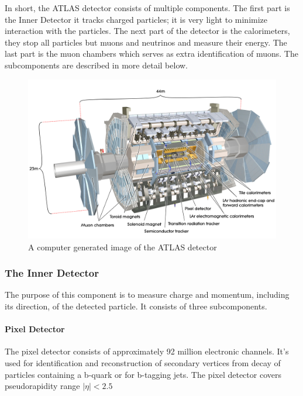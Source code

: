 \documentclass[12pt,a4paper]{article}
\numberwithin{equation}{section}
\begin{document}


In short, the ATLAS detector consists of multiple components. The first part is
the Inner Detector it tracks charged particles; it is very light to minimize
interaction with the particles. The next part of the detector is the
calorimeters, they stop all particles but muons and neutrinos and measure their
energy. The last part is the muon chambers which serves as extra identification
of muons. The subcomponents are described in more detail below.

\begin{figure}[H]
	\centering
	\includegraphics[scale=0.1]{figures/atlas.jpg}
	\caption{A computer generated image of the ATLAS detector~\cite{detector}}\label{fig:detector}
\end{figure}

\subsubsection{The Inner Detector}
The purpose of this component is to measure charge and momentum, including its
direction, of the detected particle. It consists of three subcomponents.
\paragraph{Pixel Detector}
The pixel detector consists of approximately 92 million electronic channels.
It's used for identification and reconstruction of secondary vertices from decay
of particles containing a b-quark or for b-tagging jets. The pixel detector
covers pseudorapidity range $|\eta| < 2.5 $
\end{document}
